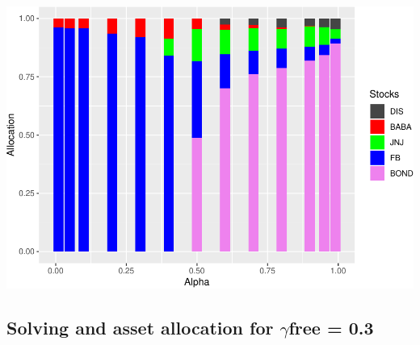 \documentclass[]{article}
\begin{document}
\includegraphics{Integrated_Management_Formulation_Model_files/figure-latex/unnamed-chunk-23-2.pdf}

\subsection{\texorpdfstring{Solving and asset allocation for
\(\gamma\)free =
0.3}{Solving and asset allocation for \textbackslash{}gammafree = 0.3}}\label{solving-and-asset-allocation-for-gammafree-0.3}
\end{document}
